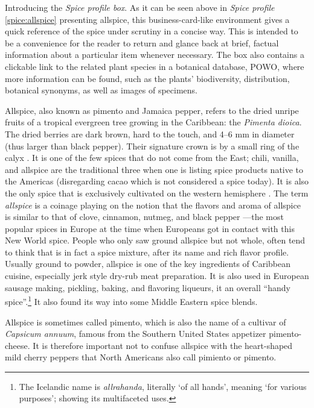 \begin{note}
	Introducing the \textit{Spice profile box}. As it can be seen above in \textit{Spice profile} \ref{spice:allspice} presenting allspice, this business-card-like environment gives a quick reference of the spice under scrutiny in a concise way. This is intended to be a convenience for the reader to return and glance back at brief, factual information about a particular item whenever necessary. The box also contains a clickable link to the related plant species in a botanical database, \gls{POWO}, where more information can be found, such as the plants' biodiversity, distribution, botanical synonyms, as well as images of specimens.
\end{note}

Allspice, also known as pimento and Jamaica pepper, refers to the dried unripe fruits of a tropical evergreen tree growing in the Caribbean: the \textit{Pimenta dioica}. The dried berries are dark brown, hard to the touch, and 4--6 mm in diameter (thus larger than black pepper). Their signature crown is by a small ring of the calyx \autocite[210]{van_wyk_culinary_2014}. It is one of the few spices that do not come from the East; chili, vanilla, and allspice are the traditional three when one is listing spice products native to the Americas (disregarding cacao which is not considered a spice today). It is also the only spice that is exclusively cultivated on the western hemisphere \autocite[21]{duke_crc_2002}. The term \textit{allspice} is a coinage playing on the notion that the flavors and aroma of allspice is similar to that of clove, cinnamon, nutmeg, and black pepper \autocite[717]{mabberley_mabberleys_2017}---the most popular spices in Europe at the time when Europeans got in contact with this New World spice. People who only saw ground allspice but not whole, often tend to think that is in fact a spice mixture, after its name and rich flavor profile. Usually ground to powder, allspice is one of the key ingredients of Caribbean cuisine, especially jerk style dry-rub meat preparation. It is also used in European sausage making, pickling, baking, and flavoring liqueurs, it an overall ``handy spice''.\footnote{The Icelandic name is \textit{allrahanda}, literally `of all hands', meaning `for various purposes'; showing its multifaceted uses.} It also found its way into some Middle Eastern spice blends.


\begin{note}
\label{note:pimento}
Allspice is sometimes called pimento, which is also the name of a cultivar of \textit{Capsicum annuum}, famous from the Southern United States appetizer pimento-cheese. It is therefore important not to confuse allspice with the heart-shaped mild cherry peppers that North Americans also call pimiento or pimento. 
\end{note}

